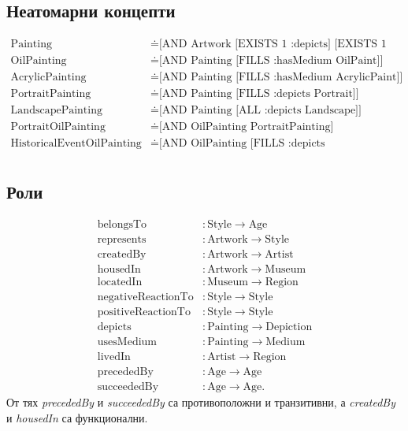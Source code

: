 \documentclass[a4paper, 11pt]{article}
\begin{document}
\subsection{Неатомарни концепти}
\begin{align*}
  \text{Painting} &\doteq \text{[AND Artwork [EXISTS 1 :depicts] [EXISTS 1 :hasMedium]]} \\
  \text{OilPainting} &\doteq \text{[AND Painting [FILLS :hasMedium OilPaint]]} \\
  \text{AcrylicPainting} &\doteq \text{[AND Painting [FILLS :hasMedium AcrylicPaint]]} \\
  \text{PortraitPainting} &\doteq \text{[AND Painting [FILLS :depicts Portrait]]} \\
  \text{LandscapePainting} &\doteq \text{[AND Painting [ALL :depicts Landscape]]} \\
  \text{PortraitOilPainting} &\doteq \text{[AND OilPainting PortraitPainting]} \\
  \text{HistoricalEventOilPainting} &\doteq \text{[AND OilPainting [FILLS :depicts HistoricalEvent]]} \\
\end{align*}

\subsection{Роли}
\begin{align*}
  \text{belongsTo} &: \text{Style} \to \text{Age}\\
  \text{represents} &: \text{Artwork} \to \text{Style}\\
  \text{createdBy} &: \text{Artwork} \to \text{Artist}\\
  \text{housedIn} &: \text{Artwork} \to \text{Museum}\\
  \text{locatedIn} &: \text{Museum} \to \text{Region}\\
  \text{negativeReactionTo} &: \text{Style} \to \text{Style}\\
  \text{positiveReactionTo} &: \text{Style} \to \text{Style}\\
  \text{depicts} &: \text{Painting} \to \text{Depiction}\\
  \text{usesMedium} &: \text{Painting} \to \text{Medium}\\
  \text{livedIn} &: \text{Artist} \to \text{Region}\\
  \text{precededBy} &: \text{Age} \to \text{Age}\\
  \text{succeededBy} &: \text{Age} \to \text{Age}.
\end{align*}
От тях \emph{precededBy} и \emph{succeededBy} са противоположни и транзитивни, а \emph{createdBy} и \emph{housedIn} са функционални.
\end{document}
